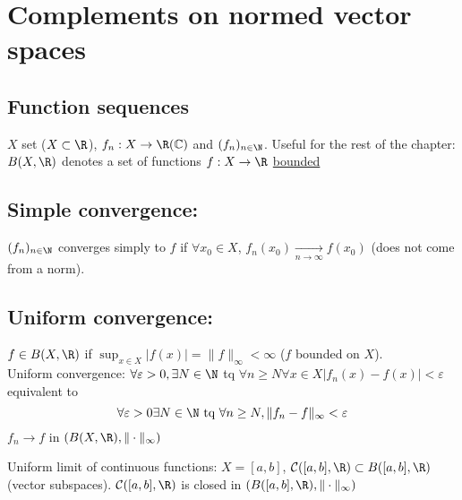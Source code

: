 \section{Complements on normed vector spaces}
\subsection{Function sequences}
$X$ set ($X \subset \R$), $f_n: X \to \R(\mathbb{C})$ and $(f_n)_{n \in \N}$. Useful for the rest of the chapter: $B(X, \R)$ denotes a set of functions $f: X \to \R$ \underline{bounded}
\subsection{Simple convergence: }
\begin{definition}
    $(f_n)_{n \in \N}$ converges simply to $f$ if $\forall x_0 \in X$, $f_n(x_0) \xrightarrow[n \to \infty]{} f(x_0)$ (does not come from a norm).
\end{definition}
\subsection{Uniform convergence: }
\begin{definition}
    $f \in B(X, \R)$ if $\sup_{x \in X} |f(x)| = \|f\|_{\infty} < \infty$ ($f$ bounded on $X$). \\
    Uniform convergence: $\forall \varepsilon > 0, \exists N \in \N$ tq $\forall n \ge N \forall x \in X |f_n(x) - f(x)| < \varepsilon$ equivalent to
    \[
    \forall \varepsilon > 0 \exists N \in \N \text{ tq } \forall n \ge N, \|f_n - f\|_{\infty} < \varepsilon
    \] 
    $f_n \to f$ in $(B(X, \R), \| \cdot \|_{\infty})$
\end{definition}
\begin{definition}
    Uniform limit of continuous functions: $X = [a, b]$, $\mathcal{C}([a, b], \R) \subset B([a, b], \R)$(vector subspaces). $\mathcal{C}([a, b], \R)$ is closed in $(B([a, b], \R), \| \cdot \|_{\infty})$
\end{definition}
